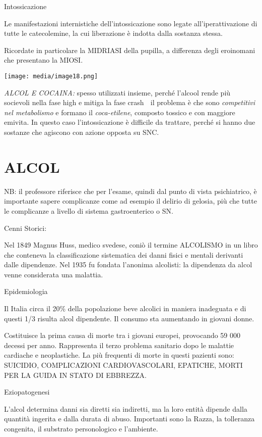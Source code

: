 \documentclass[]{article}
\begin{document}
Intossicazione

Le manifestazioni internistiche dell'intossicazione sono legate
all'iperattivazione di tutte le catecolemine, la cui liberazione è
indotta dalla sostanza stessa.

Ricordate in particolare la MIDRIASI della pupilla, a differenza degli
eroinomani che presentano la MIOSI.

\texttt{[image: media/image18.png]}

\emph{ALCOL E COCAINA:} spesso utilizzati insieme, perché l'alcool rende
più socievoli nella fase high e mitiga la fase crash  il problema è che
sono \emph{competitivi nel metabolismo} e formano il
\emph{coca-etilene}, composto tossico e con maggiore emivita. In questo
caso l'intossicazione è difficile da trattare, perché si hanno due
sostanze che agiscono con azione opposta su SNC.

\section{ALCOL}\label{alcol}

NB: il professore riferisce che per l'esame, quindi dal punto di vista
psichiatrico, è importante sapere complicanze come ad esempio il delirio
di gelosia, più che tutte le complicanze a livello di sistema
gastroenterico o SN.

Cenni Storici:

Nel 1849 Magnus Huss, medico svedese, coniò il termine ALCOLISMO in un
libro che conteneva la classificazione sistematica dei danni fisici e
mentali derivanti dalle dipendenze. Nel 1935 fu fondata l'anonima
alcolisti: la dipendenza da alcol venne considerata una malattia.

Epidemiologia

Il Italia circa il 20\% della popolazione beve alcolici in maniera
inadeguata e di questi 1/3 risulta alcol dipendente. Il consumo sta
aumentando in giovani donne.

Costituisce la prima causa di morte tra i giovani europei, provocando 59
000 decessi per anno. Rappresenta il terzo problema sanitario dopo le
malattie cardiache e neoplastiche. La più frequenti di morte in questi
pazienti sono: SUICIDIO, COMPLICAZIONI CARDIOVASCOLARI, EPATICHE, MORTI
PER LA GUIDA IN STATO DI EBBREZZA.

Eziopatogenesi

L'alcol determina danni sia diretti sia indiretti, ma la loro entità
dipende dalla quantità ingerita e dalla durata di abuso. Importanti sono
la Razza, la tolleranza congenita, il substrato personologico e
l'ambiente.
\end{document}
